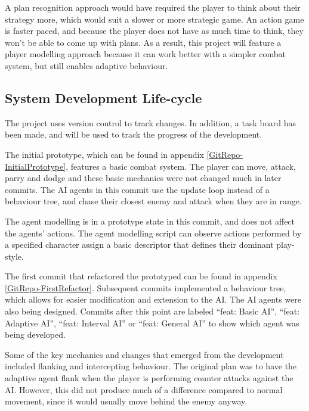\documentclass{IEEEtran}
\begin{document}
A plan recognition approach would have required the player to think about their strategy more, which would suit a slower or more strategic game. An action game is faster paced, and because the player does not have as much time to think, they won't be able to come up with plans. As a result, this project will feature a player modelling approach because it can work better with a simpler combat system, but still enables adaptive behaviour.


\subsection{System Development Life-cycle}
\label{DevLifecycle}


The project uses version control to track changes. In addition, a task board has been made, and will be used to track the progress of the development.

The initial prototype, which can be found in appendix \ref{GitRepo-InitialPrototype}, features a basic combat system. The player can move, attack, parry and dodge and these basic mechanics were not changed much in later commits. The AI agents in this commit use the update loop instead of a behaviour tree, and chase their closest enemy and attack when they are in range.

The agent modelling is in a prototype state in this commit, and does not affect the agents' actions. The agent modelling script can observe actions performed by a specified character assign a basic descriptor that defines their dominant play-style.

The first commit that refactored the prototyped can be found in appendix \ref{GitRepo-FirstRefactor}. Subsequent commits implemented a behaviour tree, which allows for easier modification and extension to the AI. The AI agents were also being designed. Commits after this point are labeled “feat: Basic AI”, “feat: Adaptive AI”, “feat: Interval AI” or “feat: General AI” to show which agent was being developed.

Some of the key mechanics and changes that emerged from the development included flanking and intercepting behaviour. The original plan was to have the adaptive agent flank when the player is performing counter attacks against the AI. However, this did not produce much of a difference compared to normal movement, since it would usually move behind the enemy anyway.
\end{document}
